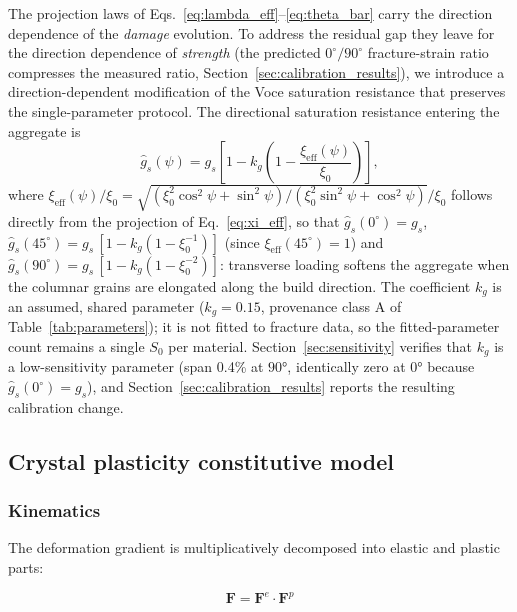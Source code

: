 \documentclass[12pt,a4paper,twocolumn]{article}
\begin{document}
The projection laws of Eqs.~\eqref{eq:lambda_eff}--\eqref{eq:theta_bar} carry the direction dependence of the \emph{damage} evolution. To address the residual gap they leave for the direction dependence of \emph{strength} (the predicted $0^\circ/90^\circ$ fracture-strain ratio compresses the measured ratio, Section~\ref{sec:calibration_results}), we introduce a direction-dependent modification of the Voce saturation resistance that preserves the single-parameter protocol. The directional saturation resistance entering the aggregate is
\begin{equation}
\hat{g}_s(\psi) = g_s \left[1 - k_g \left(1 - \frac{\xi_{\mathrm{eff}}(\psi)}{\xi_0}\right)\right],
\label{eq:gs_directional}
\end{equation}
where $\xi_{\mathrm{eff}}(\psi)/\xi_0 = \sqrt{(\xi_0^2\cos^2\psi + \sin^2\psi)/(\xi_0^2\sin^2\psi + \cos^2\psi)}/\xi_0$ follows directly from the projection of Eq.~\eqref{eq:xi_eff}, so that $\hat{g}_s(0^\circ) = g_s$, $\hat{g}_s(45^\circ) = g_s\,[1 - k_g(1 - \xi_0^{-1})]$ (since $\xi_{\mathrm{eff}}(45^\circ) = 1$) and $\hat{g}_s(90^\circ) = g_s\,[1 - k_g(1 - \xi_0^{-2})]$: transverse loading softens the aggregate when the columnar grains are elongated along the build direction. The coefficient $k_g$ is an assumed, shared parameter ($k_g = 0.15$, provenance class A of Table~\ref{tab:parameters}); it is not fitted to fracture data, so the fitted-parameter count remains a single $S_0$ per material. Section~\ref{sec:sensitivity} verifies that $k_g$ is a low-sensitivity parameter (span 0.4\% at $\ang{90}$, identically zero at $\ang{0}$ because $\hat{g}_s(0^\circ)=g_s$), and Section~\ref{sec:calibration_results} reports the resulting calibration change.

\subsection{Crystal plasticity constitutive model}
\label{sec:cp_model}

\subsubsection{Kinematics}

The deformation gradient is multiplicatively decomposed into elastic and plastic parts:

\begin{equation}
\mathbf{F} = \mathbf{F}^e \cdot \mathbf{F}^p
\label{eq:F_decomposition}
\end{equation}
\end{document}
